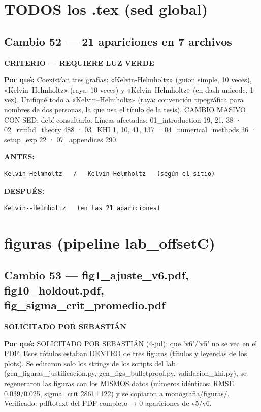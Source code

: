 \documentclass[11pt,a4paper]{article}
\begin{document}
\section*{TODOS los .tex (sed global)}
\subsection*{Cambio 52 --- 21 apariciones en 7 archivos}
\colorbox{critbg}{\textbf{\footnotesize CRITERIO --- REQUIERE LUZ VERDE}}

\textbf{Por qué:} Coexistían tres grafías: «Kelvin-Helmholtz» (guion simple, 10 veces), «Kelvin--Helmholtz» (raya, 10 veces) y «Kelvin–Helmholtz» (en-dash unicode, 1 vez). Unifiqué todo a «Kelvin--Helmholtz» (raya: convención tipográfica para nombres de dos personas, la que usa el título de la tesis). CAMBIO MASIVO CON SED: debí consultarlo. Líneas afectadas: 01\_introduction 19, 21, 38 · 02\_rrmhd\_theory 488 · 03\_KHI 1, 10, 41, 137 · 04\_numerical\_methods 36 · setup\_exp 22 · 07\_appendices 290.

\textcolor{antesline}{\textbf{ANTES:}}
\begin{Verbatim}[breaklines=true, breakanywhere=true, fontsize=\small, frame=leftline, rulecolor=\color{antesline}, framerule=1.2pt]
Kelvin-Helmholtz   /   Kelvin–Helmholtz   (según el sitio)
\end{Verbatim}
\textcolor{despline}{\textbf{DESPUÉS:}}
\begin{Verbatim}[breaklines=true, breakanywhere=true, fontsize=\small, frame=leftline, rulecolor=\color{despline}, framerule=1.2pt]
Kelvin--Helmholtz   (en las 21 apariciones)
\end{Verbatim}


\section*{figuras (pipeline lab\_offsetC)}
\subsection*{Cambio 53 --- fig1\_ajuste\_v6.pdf, fig10\_holdout.pdf, fig\_sigma\_crit\_promedio.pdf}
\colorbox{usrbg}{\textbf{\footnotesize SOLICITADO POR SEBASTIÁN}}

\textbf{Por qué:} SOLICITADO POR SEBASTIÁN (4-jul): que 'v6'/'v5' no se vea en el PDF. Esos rótulos estaban DENTRO de tres figuras (títulos y leyendas de los plots). Se editaron solo los strings de los scripts del lab (gen\_figuras\_justificacion.py, gen\_figs\_bulletproof.py, validacion\_khi.py), se regeneraron las figuras con los MISMOS datos (números idénticos: RMSE 0.039/0.025, sigma\_crit 2861±122) y se copiaron a monografia/figuras/. Verificado: pdftotext del PDF completo → 0 apariciones de v5/v6.
\end{document}
